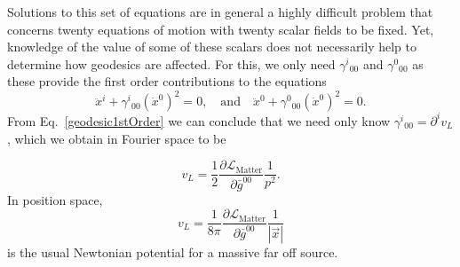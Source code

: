 \documentclass[twocolumn,aps,
  showpacs,showkeys,prd,superscriptaddress]{revtex4-1}
\renewcommand{\(}{\left(}
\renewcommand{\)}{\right)}
\renewcommand{\[}{\left[}
\renewcommand{\]}{\right]}
\newcommand{\out}[1]{{\color{red} \sout{#1}}}
\begin{document}
Solutions to this set of equations are in general a highly difficult problem that concerns twenty equations of motion with twenty scalar fields to be fixed. Yet, knowledge of the value of some of these scalars does not necessarily help to determine how geodesics are affected. For this, we only need $\gamma^i{}_{00}$ and $\gamma^0{}_{00}$ as these provide the first order contributions to the equations
\begin{equation}
  \label{geodesic1stOrder}
  \ddot{x}^i + \gamma^i{}_{00}(\dot{x}^0)^2 = 0,
  \quad \text{and} \quad
  \ddot{x}^0 + \gamma^0{}_{00}(\dot{x}^0)^2 = 0.
\end{equation}
From Eq.~\eqref{geodesic1stOrder} we can conclude that we need only know $\gamma^i{}_{00} = \partial^i v_L$, which we obtain in Fourier space to be

\begin{equation}
  v_L=\frac{1}{2}\frac{\partial\mathcal{L}_{\text{Matter}}}{\partial\bar{g}^{00}}\frac{1}{p^2}.
\end{equation}
In position space, 
\begin{equation}
  v_L = \frac{1}{8\pi} \frac{ \partial\mathcal{L}_{\text{Matter}} }{ \partial \bar{g}^{00} } \frac{1}{|\vec{x}|}
\end{equation}
is the usual Newtonian potential for a massive far off source.




\end{document}
